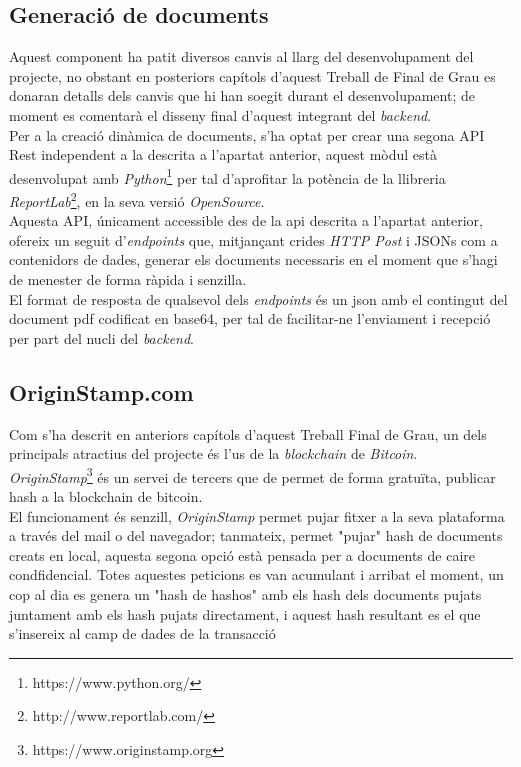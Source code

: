 \subsection{Generació de documents}
Aquest component ha patit diversos canvis al llarg del desenvolupament del projecte, no obstant en posteriors capítols d'aquest Treball de Final de Grau es donaran detalls dels canvis que hi han soegit durant el desenvolupament; de moment es comentarà el disseny final d'aquest integrant del \textit{backend}.\\
\newline Per a la creació dinàmica de documents, s'ha optat per crear una segona API Rest independent a la descrita a l'apartat anterior, aquest mòdul està desenvolupat amb \textit{Python}\footnote{https://www.python.org/} per tal d'aprofitar la potència de la llibreria \textit{ReportLab}\footnote{http://www.reportlab.com/}, en la seva versió \textit{OpenSource}.\\
\newline Aquesta API, únicament accessible des de la api descrita a l'apartat anterior, ofereix un seguit d'\textit{endpoints} que, mitjançant crides \textit{HTTP Post} i JSONs com a contenidors de dades, generar els documents necessaris en el moment que s'hagi de menester de forma ràpida i senzilla.\\
\newline El format de resposta de qualsevol dels \textit{endpoints} és un json amb el contingut del document pdf codificat en base64, per tal de facilitar-ne l'enviament i recepció per part del nucli del \textit{backend}. 

\subsection{OriginStamp.com}
Com s'ha descrit en anteriors capítols d'aquest Treball Final de Grau, un dels principals atractius del projecte és l'us de la \textit{blockchain} de \textit{Bitcoin}.\\
\newline \textit{OriginStamp}\footnote{https://www.originstamp.org} és un servei de tercers que de permet de forma gratuïta, publicar hash a la blockchain de bitcoin.\\
El funcionament és senzill, \textit{OriginStamp} permet pujar fitxer a la seva plataforma a través del mail o del navegador; tanmateix, permet "pujar" hash de documents creats en local, aquesta segona opció està pensada per a documents de caire condfidencial. Totes aquestes peticions es van acumulant i arribat el moment, un cop al dia es genera un "hash de hashos" amb els hash dels documents pujats juntament amb els hash pujats directament, i aquest hash resultant es el que s'insereix al camp de dades  de la transacció






